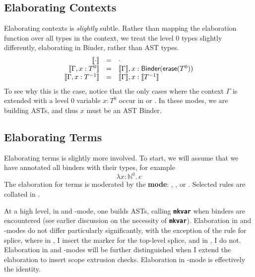 \subsection{Elaborating Contexts}
Elaborating contexts is \textit{slightly} subtle. Rather than mapping the elaboration function over all types in the context, we treat the level $0$ types slightly differently, elaborating in \textsf{Binder}, rather than \textsf{AST} types. 
\[
\begin{array}{rcl}
  \llbracket \cdot \rrbracket & = & \cdot \\
  \llbracket \Gamma, x:T^0 \rrbracket & = & \llbracket \Gamma \rrbracket, x: \textsf{Binder}(\textsf{erase}(T^0))\\
  \llbracket \Gamma, x:T^{-1} \rrbracket & = & \llbracket \Gamma \rrbracket, x: \llbracket T^{-1} \rrbracket
\end{array}
\]
To see why this is the case, notice that the only cases where the context $\Gamma$ is extended with a level $0$ variable $x: T^0$ occur in \compilemode{} or \quotemode{}. In these modes, we are building ASTs, and thus $x$ must be an AST \textsf{Binder}. 

\subsection{Elaborating Terms}
Elaborating terms is slightly more involved. To start, we will assume that we have annotated all binders with their types, for example 
\[\lambda x: \mathbb{N}^0. \, e\]
The elaboration for terms is moderated by the \textbf{mode}: \compilemode{}, \quotemode{}, or \splicemode{}. Selected rules are collated in . 

At a high level, in \compilemode{} and \quotemode{}-mode, one builds ASTs, calling \textbf{\texttt{mkvar}} when binders are encountered (see earlier discussion on the necessity of \textbf{\texttt{mkvar}}). Elaboration in \compilemode{} and \quotemode{}-modes do not differ particularly significantly, with the exception of the rule for splice, where in \compilemode{}, I insert the marker for the top-level splice, and in \quotemode{}, I do not. Elaboration in \compilemode{} and \quotemode{}-modes will be further distinguished when I extend the elaboration to insert scope extrusion checks. Elaboration in \splicemode{}-mode is effectively the identity. 

